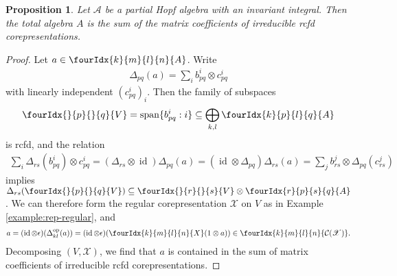 \documentclass[10pt]{article}
\DeclareMathOperator{\id}{id}
\DeclareMathOperator{\op}{\mathrm{op}}
\newcommand{\Gr}[5]{\fourIdx{#2}{#4}{#3}{#5}{#1}}%
\newcommand{\Gru}[3]{\Gr{#1}{}{}{#2}{#3}}
\newtheorem{Prop}[Theorem]{Proposition}
\theoremstyle{definition}
\numberwithin{equation}{section}
\begin{document}
\begin{Prop} \label{prop:rep-weak-pw} Let $\mathscr{A}$ be a partial
  Hopf algebra with an invariant integral. Then the total algebra $A$ is the sum
  of the matrix coefficients of irreducible rcfd corepresentations.
\end{Prop}
\begin{proof} 
  Let $a \in \Gr{A}{k}{l}{m}{n}$. Write
  \begin{align*}
    \Delta_{pq}(a)=\sum_{i} b_{pq}^{i} \otimes c^{i}_{pq}
  \end{align*}
 with linearly independent
  $(c_{pq}^{i})_{i}$. Then the family of subspaces
  \begin{align*}
    \Gru{V}{p}{q} = \mathrm{span}\{b_{pq}^{i} : i \}\subseteq \bigoplus_{k,l}
  \Gr{A}{k}{l}{p}{q}
  \end{align*}
is rcfd, and the relation
  \begin{align*}
 \sum_{i}
    \Delta_{rs}(b^{i}_{pq}) \otimes c^{i}_{pq} =
    (\Delta_{rs} \otimes \id)\Delta_{pq}(a) = (\id \otimes
    \Delta_{pq}) \Delta_{rs}(a) = \sum_{j} b^{j}_{rs} \otimes
    \Delta_{pq}(c^{j}_{rs})
  \end{align*}
  implies $\Delta_{rs}(\Gru{V}{p}{q}) \subseteq \Gru{V}{r}{s} \otimes
  \Gr{A}{r}{s}{p}{q}$.  We can therefore form the regular
  corepresentation $\mathscr{X}$ on $V$ as in Example \ref{example:rep-regular}, and
  \begin{align*}
    a = (\id \otimes \epsilon)(\Delta^{\op}_{kl}(a)) =
    (\id \otimes \epsilon)(\Gr{X}{k}{l}{m}{n}(1 \otimes a)) \in
    \Gr{\mathcal{C}(\mathscr{X})}{k}{l}{m}{n}.
  \end{align*}
  Decomposing $(V,\mathscr{X})$, we find that
  $a$ is contained in the sum of matrix coefficients of irreducible
rcfd  corepresentations.
\end{proof}
\end{document}
